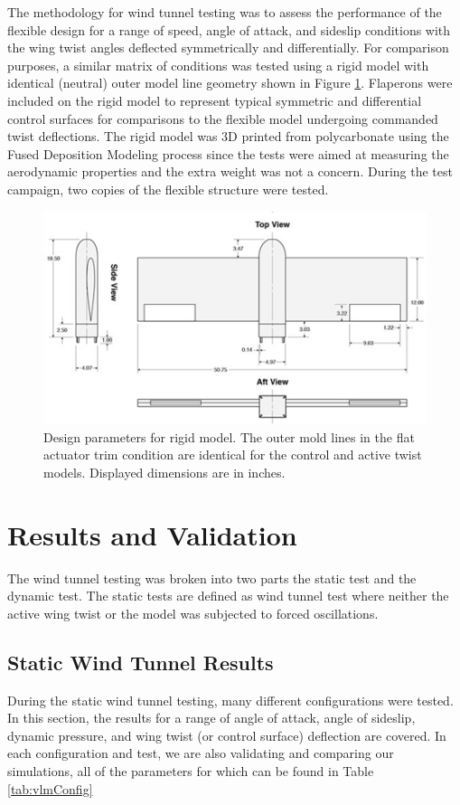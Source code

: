 \documentclass[11pt]{ucthesis}
\begin{document}
The methodology for wind tunnel testing was to assess the performance of the flexible design for a range of speed, angle of attack, and sideslip conditions with the wing twist angles deflected symmetrically and differentially. For comparison purposes, a similar matrix of conditions was tested using a rigid model with identical (neutral) outer model line geometry shown in Figure \ref{fig:rigid}. Flaperons were included on the rigid model to represent typical symmetric and differential control surfaces for comparisons to the flexible model undergoing commanded twist deflections. The rigid model was 3D printed from polycarbonate using the Fused Deposition Modeling process since the tests were aimed at measuring the aerodynamic properties and the extra weight was not a concern. During the test campaign, two copies of the flexible structure were tested.

\begin{figure}[thpb]
\centering
\includegraphics[width=0.75\linewidth]{Figures/rigidModel.png}
\caption{Design parameters for rigid model. The outer mold lines in the flat actuator trim condition are identical for the control and active twist models. Displayed dimensions are in inches.}
\label{fig:rigid}
\end{figure}

\section{Results and Validation}
The wind tunnel testing was broken into two parts the static test and the dynamic test. The static tests are defined as wind tunnel test where neither the active wing twist or the model was subjected to forced oscillations. 

\subsection{Static Wind Tunnel Results}
During the static wind tunnel testing, many different configurations were tested. In this section, the results for a range of angle of attack, angle of sideslip, dynamic pressure, and wing twist (or control surface) deflection are covered. In each configuration and test, we are also validating and comparing our simulations, all of the parameters for which can be found in Table \ref{tab:vlmConfig}
\end{document}
